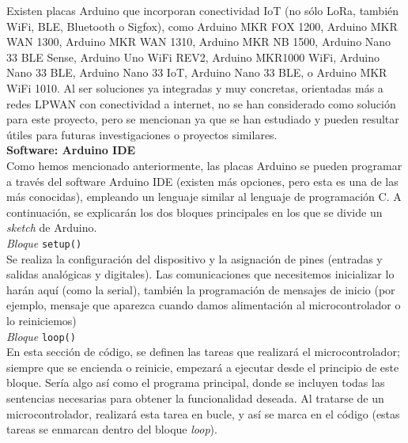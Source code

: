 \documentclass[12pt]{article}
\begin{document}
	\noindent Existen placas Arduino que incorporan conectividad IoT (no sólo LoRa, también WiFi, BLE, Bluetooth o Sigfox), como Arduino MKR FOX 1200, Arduino MKR WAN 1300, Arduino MKR WAN 1310, Arduino MKR NB 1500, Arduino Nano 33 BLE Sense, Arduino Uno WiFi REV2, Arduino MKR1000 WiFi, Arduino Nano 33 BLE, Arduino Nano 33 IoT, Arduino Nano 33 BLE, o Arduino MKR WiFi 1010.  Al ser soluciones ya integradas y muy concretas, orientadas más a redes LPWAN con conectividad a internet, no se han considerado como solución para este proyecto, pero se mencionan ya que se han estudiado y pueden resultar útiles para futuras investigaciones o proyectos similares.\\
	
	
	\noindent \textbf{Software: Arduino IDE} \\
	
	
	\noindent Como hemos mencionado anteriormente, las placas Arduino se pueden programar a través del software Arduino IDE (existen más opciones, pero esta es una de las más conocidas), empleando un lenguaje similar al lenguaje de programación C. A continuación, se explicarán los dos bloques principales en los que se divide un \textit{sketch} de Arduino.\\
	
	\noindent \textit{Bloque} \texttt{setup()} \\
	
	\noindent Se realiza la configuración del dispositivo y la
	asignación de pines (entradas y salidas analógicas y digitales). Las comunicaciones que necesitemos inicializar lo harán aquí (como la serial), también la programación de mensajes de inicio (por ejemplo, mensaje que aparezca cuando damos alimentación al microcontrolador o lo reiniciemos)\\
	
	\noindent \textit{Bloque} \texttt{loop()} \\
	
	\noindent En esta sección de código, se definen las tareas que realizará el microcontrolador; siempre que se encienda o reinicie, empezará a ejecutar desde el principio de este bloque. Sería algo así como el programa principal, donde se incluyen todas las sentencias necesarias para obtener la funcionalidad deseada. Al tratarse de un microcontrolador, realizará esta tarea en bucle, y así se marca en el código (estas tareas se enmarcan dentro del bloque \textit{loop}). \\
	
\end{document}
